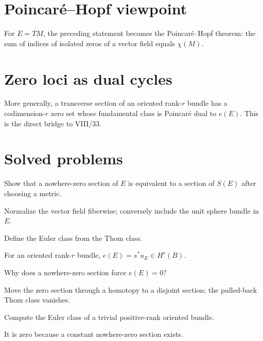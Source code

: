 \section{Poincaré--Hopf viewpoint}
For $E=TM$, the preceding statement becomes the Poincaré--Hopf theorem: the
sum of indices of isolated zeros of a vector field equals $\chi(M)$.

\section{Zero loci as dual cycles}
More generally, a transverse section of an oriented rank-$r$ bundle has a
codimension-$r$ zero set whose fundamental class is Poincaré dual to $e(E)$.
This is the direct bridge to VIII/33.

\section{Solved problems}
\begin{problem}
Show that a nowhere-zero section of $E$ is equivalent to a section of $S(E)$ after choosing a metric.
\end{problem}
\begin{solution}
Normalize the vector field fiberwise; conversely include the unit sphere bundle in $E$.
\end{solution}

\begin{problem}
Define the Euler class from the Thom class.
\end{problem}
\begin{solution}
For an oriented rank-$r$ bundle, $e(E)=s^*u_E\in H^r(B)$.
\end{solution}

\begin{problem}
Why does a nowhere-zero section force $e(E)=0$?
\end{problem}
\begin{solution}
Move the zero section through a homotopy to a disjoint section; the pulled-back Thom class vanishes.
\end{solution}

\begin{problem}
Compute the Euler class of a trivial positive-rank oriented bundle.
\end{problem}
\begin{solution}
It is zero because a constant nowhere-zero section exists.
\end{solution}

